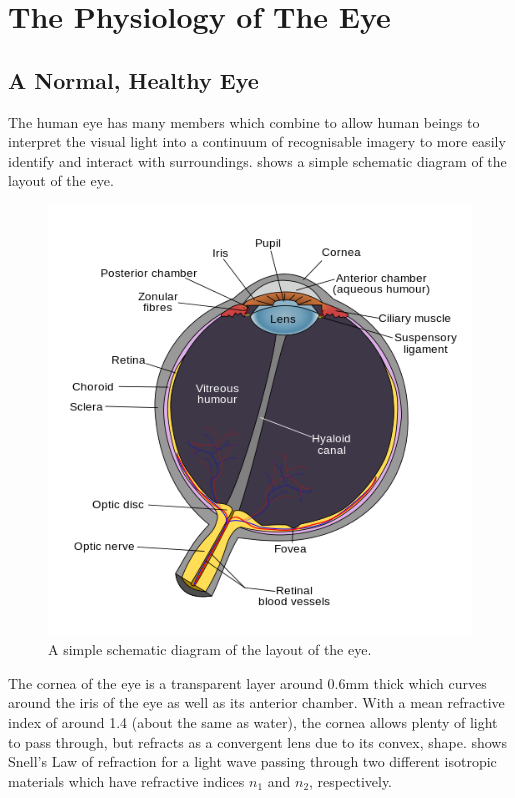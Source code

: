 
\chapter{The Physiology of The Eye}

\label{anatomy}
\section{A Normal, Healthy Eye}

The human eye has many members which combine to allow human beings to
interpret the visual light into a continuum of recognisable imagery
to more easily identify and interact with surroundings. 
shows a simple schematic diagram of the layout of the eye.

\begin{figure}[!htbp]
  \centering
    \includegraphics{figures/schematic_diagram_of_the_human_eye}
  \caption{A simple schematic diagram of the layout of the eye.\cite{wikiRhcastilhos}}
  \label{fig:eye_simple}
\end{figure}

The cornea of the eye is a transparent layer around 0.6mm thick
which curves around the iris of the eye as well as its anterior
chamber.\cite{yaylali1997corneal,thoft1983x,patel1994refractive}
With a mean refractive index of around 1.4 (about the same as water),
the cornea allows plenty of light to pass through, but refracts as a
convergent lens due to its convex, shape.  shows
Snell's Law of refraction for a light wave passing through two
different isotropic materials which have refractive indices $n_1$
and $n_2$, respectively.

